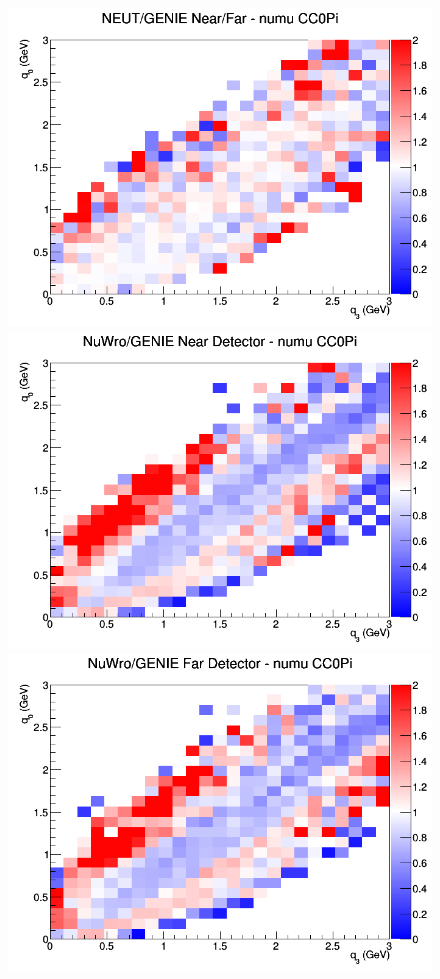 \begin{figure}[h]
\endminipage
{}
\includegraphics[width=\linewidth]{eff_q0_q3/LAr/ratios/CC0Pi_NEUT_GENIE_numu_NF_q3_q0.png}
\endminipage
\newline
{}
\includegraphics[width=\linewidth]{eff_q0_q3/LAr/ratios/CC0Pi_NuWro_GENIE_numu_near_q3_q0.png}
\endminipage
{}
\includegraphics[width=\linewidth]{eff_q0_q3/LAr/ratios/CC0Pi_NuWro_GENIE_numu_far_q3_q0.png}

\end{figure}
